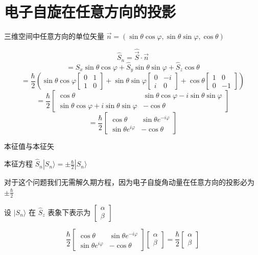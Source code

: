 \documentclass[lang=cn,10pt]{elegantbook}
\begin{document}
\section{电子自旋在任意方向的投影}
三维空间中任意方向的单位矢量 $\vec{n} = (\sin\theta \cos\varphi, \sin\theta \sin\varphi, \cos\theta)$

\[
\hat{S}_n = \hat{\vec{S}} \cdot \vec{n}
\]
\[
= \hat{S}_x \sin\theta \cos\varphi + \hat{S}_y \sin\theta \sin\varphi + \hat{S}_z \cos\theta
\]
\[
= \frac{\hbar}{2} \left( \sin\theta \cos\varphi \begin{bmatrix} 0 & 1 \\ 1 & 0 \end{bmatrix} + \sin\theta \sin\varphi \begin{bmatrix} 0 & -i \\ i & 0 \end{bmatrix} + \cos\theta \begin{bmatrix} 1 & 0 \\ 0 & -1 \end{bmatrix} \right)
\]
\[
= \frac{\hbar}{2} \begin{bmatrix} \cos\theta & \sin\theta \cos\varphi - i \sin\theta \sin\varphi \\ \sin\theta \cos\varphi + i \sin\theta \sin\varphi & -\cos\theta \end{bmatrix}
\]
\[
= \frac{\hbar}{2} \begin{bmatrix} \cos\theta & \sin\theta e^{-i\varphi} \\ \sin\theta e^{i\varphi} & -\cos\theta \end{bmatrix}
\]

本征值与本征矢

本征方程 $\hat{S}_n |S_n\rangle = \pm \frac{\hbar}{2} |S_n\rangle$

对于这个问题我们无需解久期方程，因为电子自旋角动量在任意方向的投影必为 $\pm \frac{\hbar}{2}$

设 $|S_n\rangle$ 在 $\hat{S}_z$ 表象下表示为 $\begin{bmatrix} \alpha \\ \beta \end{bmatrix}$

\[
\frac{\hbar}{2} \begin{bmatrix} \cos\theta & \sin\theta e^{-i\varphi} \\ \sin\theta e^{i\varphi} & -\cos\theta \end{bmatrix} \begin{bmatrix} \alpha \\ \beta \end{bmatrix} = \frac{\hbar}{2} \begin{bmatrix} \alpha \\ \beta \end{bmatrix}
\]
\end{document}
